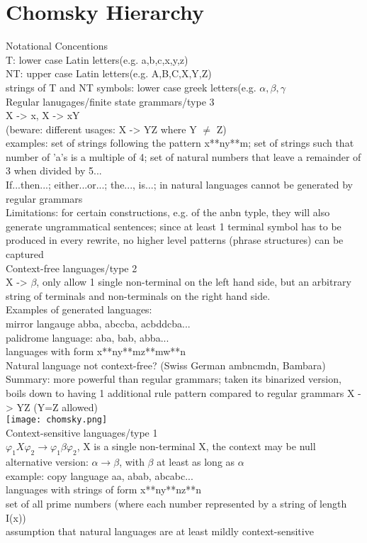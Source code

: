 \section{Chomsky Hierarchy}
\scriptsize{Notational Concentions}\\ {\tiny T: lower case Latin letters(e.g. a,b,c,x,y,z) \\
NT: upper case Latin letters(e.g. A,B,C,X,Y,Z) \\
strings of T and NT symbols: lower case greek letters(e.g. $\alpha, \beta, \gamma$ }\\
\scriptsize{Regular lanugages/finite state grammars/type 3}\\ {\tiny X -> x, 
X -> xY\\
(beware: different usages: X -> YZ where Y $\neq$ Z)\\
examples: set of strings following the pattern x**ny**m; set of strings such that number of 'a's is a multiple of 4; set of natural numbers that leave a remainder of 3 when divided by 5...\\
If...then...; either...or...; the..., is...; in natural languages cannot be generated by regular grammars\\
Limitations: for certain constructions, e.g. of the anbn typle, they will also generate ungrammatical sentences; since at least 1 terminal symbol has to be produced in every rewrite, no higher level patterns (phrase structures) can be captured
}\\
\scriptsize{Context-free languages/type 2}\\ 
{\tiny X -> $\beta$, only allow 1 single non-terminal on the left hand side, but an arbitrary string of terminals and non-terminals on the right hand side.\\
Examples of generated languages: \\
mirror langauge abba, abccba, acbddcba...\\
palidrome language: aba, bab, abba...\\
languages with form x**ny**mz**mw**n\\
Natural language not context-free? (Swiss German ambncmdn, Bambara)\\
Summary: more powerful than regular grammars; taken its binarized version, boils down to having 1 additional rule pattern compared to regular grammars X -> YZ (Y=Z allowed)
}\\
\texttt{[image: chomsky.png]}\\
\scriptsize{Context-sensitive languages/type 1}\\ {\tiny $\varphi_1 X \varphi_2 \to \varphi_1 \beta \varphi_2$, X is a single non-terminal X, the context may be null\\
alternative version: $\alpha \to \beta$, with $\beta$ at least as long as $\alpha$\\
example: copy language aa, abab, abcabc...\\
languages with strings of form x**ny**nz**n\\
set of all prime numbers (where each number represented by a string of length I(x))\\
assumption that natural languages are at least mildly context-sensitive
}\\
